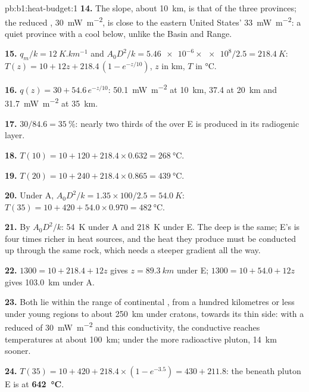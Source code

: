 \begin{solution}{pb:b1:heat-budget:1}
\textbf{14.} The slope, about \qty{10}{km}, is that of the three provinces; the
reduced , \qty{30}{mW.m^{-2}}, is close to the eastern United States'
\qty{33}{mW.m^{-2}}: a quiet province with a cool  below, unlike the Basin
and Range.

\textbf{15.} $q_m/k = \qty{12}{K.km^{-1}}$ and $A_0D^2/k = \num{5.46e-6}\times\num{e8}/2.5
= \qty{218.4}{K}$: $T(z) = 10 + 12z + 218.4\,(1 - e^{-z/10})$, $z$ in km, $T$ in
\unit{\degreeCelsius}.

\textbf{16.} $q(z) = 30 + 54.6\,e^{-z/10}$: \qty{50.1}{mW.m^{-2}} at \qty{10}{km},
\num{37.4} at \qty{20}{km} and \qty{31.7}{mW.m^{-2}} at \qty{35}{km}.

\textbf{17.} $30/84.6 = \qty{35}{\percent}$: nearly two thirds of the 
over E is produced in its radiogenic layer.

\textbf{18.} $T(10) = 10 + 120 + 218.4\times0.632 = \qty{268}{\degreeCelsius}$.

\textbf{19.} $T(20) = 10 + 240 + 218.4\times0.865 = \qty{439}{\degreeCelsius}$.

\textbf{20.} Under A, $A_0D^2/k = 1.35\times100/2.5 = \qty{54.0}{K}$:
$T(35) = 10 + 420 + 54.0\times0.970 = \qty{482}{\degreeCelsius}$.

\textbf{21.} By $A_0D^2/k$: \qty{54}{K} under A and \qty{218}{K} under E. The deep
 is the same; E's  is four times richer in heat sources, and the
heat they produce must be conducted up through the same rock, which needs a
steeper gradient all the way.

\textbf{22.} $1300 = 10 + 218.4 + 12z$ gives $z = \qty{89.3}{km}$ under E;
$1300 = 10 + 54.0 + 12z$ gives \qty{103.0}{km} under A.

\textbf{23.} Both lie within the range of continental , from a
hundred kilometres or less under young regions to about \qty{250}{km} under
cratons, towards its thin side: with a reduced  of \qty{30}{mW.m^{-2}} and this
conductivity, the conductive  reaches  temperatures at about
\qty{100}{km}; under the more radioactive pluton, \qty{14}{km} sooner.

\textbf{24.} $T(35) = 10 + 420 + 218.4\times(1 - e^{-3.5}) = 430 + 211.8$: the
 beneath pluton E is at
\textbf{\qty[text-series-to-math=true]{642}{\degreeCelsius}}.
\end{solution}
